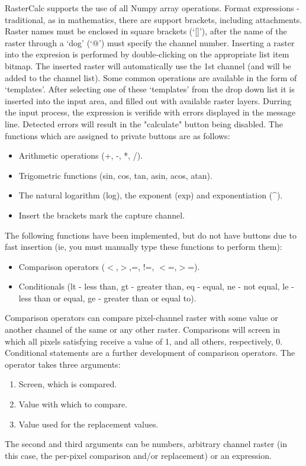 RasterCalc supports the use of all Numpy array operations. Format expressions - traditional, as in mathematics, there are support brackets, including attachments. Raster names must be enclosed in square brackets (`[]'), after the name of the raster through a `dog' (`@') must specify the channel number. Inserting a raster into the expresion is performed by double-clicking on the appropriate list item bitmap. The inserted raster will automatically use the 1st channel (and will be added to the channel list). 
Some common operations are available in the form of `templates'. After selecting one of these `templates' from the drop down list it is inserted into the input area, and filled out with available raster layers.
Durring the input process, the expression is verifide with errors displayed in the message line.  Detected errors will result in the "calculate" button being disabled. 
\vspace{5mm}
The functions which are assigned to private buttons are as follows:
	\begin{itemize}
		\item Arithmetic operations (+, -, *, /).
		\item Trigometric functions (sin, cos, tan, asin, acos, atan).
		\item The natural logarithm (log), the exponent (exp) and exponentiation (\^{}).
		\item Insert the brackets mark the capture channel.
	\end{itemize}
The following functions have been implemented, but do not have buttons due to fast insertion (ie, you must manually type these functions to perform them): 
	\begin{itemize}
		\item Comparison operators ($<$,$>$,=, !=, $<$=,$>$=).
		\item Conditionals (lt - less than, gt - greater than, eq - equal, ne - not equal, le - less than or equal, ge - greater than or equal to).
	\end{itemize}
\vspace{5mm}
Comparison operators can compare pixel-channel raster with some value or another channel of the same or any other raster. Comparisons will screen in which all pixels satisfying receive a value of 1, and all others, respectively, 0. Conditional statements are a further development of comparison operators. The operator takes three arguments: 
	\begin{enumerate}
		\item Screen, which is compared.
		\item Value with which to compare. 
		\item Value used for the replacement values.
	\end{enumerate}
The second and third arguments can be numbers, arbitrary channel raster (in this case, the per-pixel comparison and/or replacement) or an expression. 

